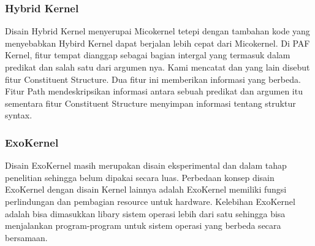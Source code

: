 \subsubsection{Hybrid Kernel}
 Disain Hybrid Kernel menyerupai Micokernel tetepi dengan tambahan kode yang menyebabkan Hybird Kernel dapat berjalan lebih cepat dari Micokernel. 
 Di PAF Kernel, fitur tempat dianggap sebagai bagian intergal yang termasuk dalam predikat dan salah satu dari argumen nya. Kami mencatat dan yang lain disebut fitur 
 Constituent Structure. Dua fitur ini memberikan informasi yang berbeda. Fitur Path mendeskripsikan informasi antara sebuah predikat dan argumen itu sementara fitur 
 Constituent Structure menyimpan informasi tentang struktur syntax.
	
\subsubsection{ExoKernel}
 Disain ExoKernel masih merupakan disain eksperimental dan dalam tahap penelitian sehingga belum dipakai secara luas. Perbedaan konsep disain ExoKernel dengan disain Kernel 
 lainnya adalah ExoKernel memiliki fungsi perlindungan dan pembagian resource untuk hardware. Kelebihan ExoKernel adalah bisa dimasukkan libary sistem operasi lebih dari satu 
 sehingga bisa menjalankan program-program untuk sistem operasi yang berbeda secara bersamaan. 
	
